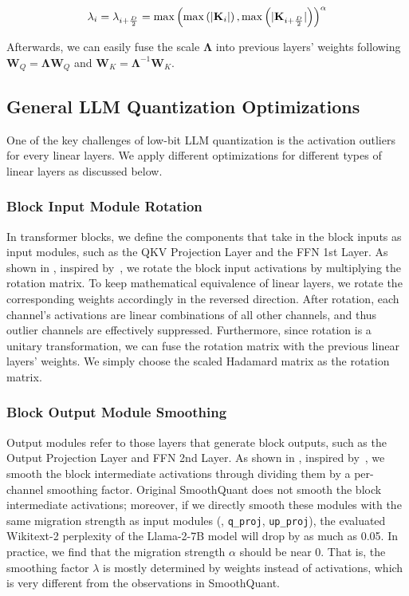 \vspace{-15pt}
\begin{equation}
   \small \mathbf{\lambda}_{i} = \lambda_{i + \frac{D}{2}} = \max\left(\max\left(|\mathbf{K}_i|\right), \max\left(|\mathbf{K}_{i+\frac{D}{2}}|\right)\right)^{\alpha}
\end{equation}
\vspace{-15pt}

Afterwards, we can easily fuse the \smoothattention scale $\mathbf{\Lambda}$ into previous layers' weights following $\mathbf{W}_{Q} = \mathbf{\Lambda}\mathbf{W}_{Q}$ and  $\mathbf{W}_{K} = \mathbf{\Lambda}^{-1}\mathbf{W}_{K}$.


\subsection{General LLM Quantization Optimizations}
\label{sect:alg:other}
One of the key challenges of low-bit LLM quantization is the activation outliers for every linear layers. We apply different optimizations for different types of linear layers as discussed below.


\subsubsection{Block Input Module Rotation}
\label{sect:alg:other:rotation}
In transformer blocks, we define the components that take in the block inputs as input modules, such as the QKV Projection Layer and the FFN 1st Layer. 
As shown in , inspired by~\cite{ashkboos2024quarot,quip}, we rotate the block input activations by multiplying the rotation matrix. To keep mathematical equivalence of linear layers, we rotate the corresponding weights accordingly in the reversed direction.
After rotation, each channel's activations are linear combinations of all other channels, and thus outlier channels are effectively suppressed. Furthermore, since rotation is a unitary transformation, we can fuse the rotation matrix with the previous linear layers' weights. We simply choose the scaled Hadamard matrix as the rotation matrix.

\subsubsection{Block Output Module Smoothing}
\label{sect:alg:other:smooth}
Output modules refer to those layers that generate block outputs, such as the Output Projection Layer and FFN 2nd Layer. As shown in , inspired by~\cite{xiao2023smoothquant}, we smooth the block intermediate activations through dividing them by a per-channel smoothing factor. Original SmoothQuant does not smooth the block intermediate activations; moreover, if we directly smooth these modules with the same migration strength as input modules (\eg, \texttt{q\_proj}, \texttt{up\_proj}), the evaluated Wikitext-2 perplexity of the Llama-2-7B model will drop by as much as 0.05. In practice, we find that the migration strength $\alpha$ should be near 0. That is, the smoothing factor $\lambda$ is mostly determined by weights instead of activations, which is very different from the observations in SmoothQuant.

